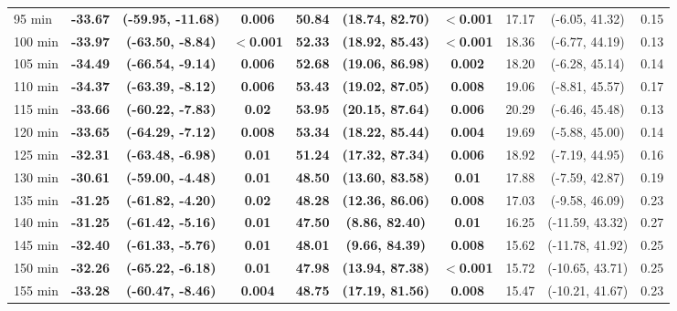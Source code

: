\begin{table}[ht]
{\begin{tabular}{lccccccccc}
95 min & \textbf{-33.67} & \textbf{(-59.95, -11.68)} & \textbf{0.006} & \textbf{50.84} & \textbf{(18.74, 82.70)} & \textbf{$<$0.001} & 17.17 & (-6.05, 41.32) & 0.15 \\
100 min & \textbf{-33.97} & \textbf{(-63.50, -8.84)} & \textbf{$<$0.001} & \textbf{52.33} & \textbf{(18.92, 85.43)} & \textbf{$<$0.001} & 18.36 & (-6.77, 44.19) & 0.13 \\
105 min & \textbf{-34.49} & \textbf{(-66.54, -9.14)} & \textbf{0.006} & \textbf{52.68} & \textbf{(19.06, 86.98)} & \textbf{0.002} & 18.20 & (-6.28, 45.14) & 0.14 \\
110 min & \textbf{-34.37} & \textbf{(-63.39, -8.12)} & \textbf{0.006} & \textbf{53.43} & \textbf{(19.02, 87.05)} & \textbf{0.008} & 19.06 & (-8.81, 45.57) & 0.17 \\
115 min & \textbf{-33.66} & \textbf{(-60.22, -7.83)} & \textbf{0.02} & \textbf{53.95} & \textbf{(20.15, 87.64)} & \textbf{0.006} & 20.29 & (-6.46, 45.48) & 0.13 \\
120 min & \textbf{-33.65} & \textbf{(-64.29, -7.12)} & \textbf{0.008} & \textbf{53.34} & \textbf{(18.22, 85.44)} & \textbf{0.004} & 19.69 & (-5.88, 45.00) & 0.14 \\
125 min & \textbf{-32.31} & \textbf{(-63.48, -6.98)} & \textbf{0.01} & \textbf{51.24} & \textbf{(17.32, 87.34)} & \textbf{0.006} & 18.92 & (-7.19, 44.95) & 0.16 \\
130 min & \textbf{-30.61} & \textbf{(-59.00, -4.48)} & \textbf{0.01} & \textbf{48.50} & \textbf{(13.60, 83.58)} & \textbf{0.01} & 17.88 & (-7.59, 42.87) & 0.19 \\
135 min & \textbf{-31.25} & \textbf{(-61.82, -4.20)} & \textbf{0.02} & \textbf{48.28} & \textbf{(12.36, 86.06)} & \textbf{0.008} & 17.03 & (-9.58, 46.09) & 0.23 \\
140 min & \textbf{-31.25} & \textbf{(-61.42, -5.16)} & \textbf{0.01} & \textbf{47.50} & \textbf{(8.86, 82.40)} & \textbf{0.01} & 16.25 & (-11.59, 43.32) & 0.27 \\
145 min & \textbf{-32.40} & \textbf{(-61.33, -5.76)} & \textbf{0.01} & \textbf{48.01} & \textbf{(9.66, 84.39)} & \textbf{0.008} & 15.62 & (-11.78, 41.92) & 0.25 \\
150 min & \textbf{-32.26} & \textbf{(-65.22, -6.18)} & \textbf{0.01} & \textbf{47.98} & \textbf{(13.94, 87.38)} & \textbf{$<$0.001} & 15.72 & (-10.65, 43.71) & 0.25 \\
155 min & \textbf{-33.28} & \textbf{(-60.47, -8.46)} & \textbf{0.004} & \textbf{48.75} & \textbf{(17.19, 81.56)} & \textbf{0.008} & 15.47 & (-10.21, 41.67) & 0.23 \\

\end{tabular}}
\end{table}

